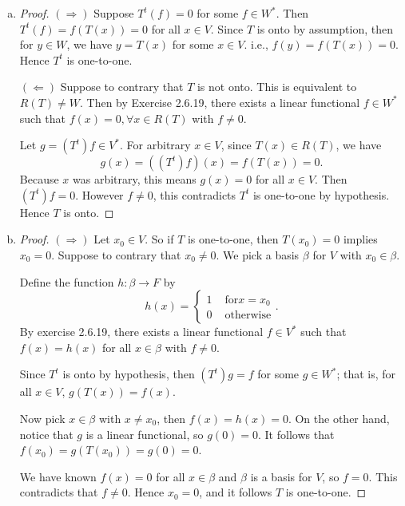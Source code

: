 \begin{Exercise}
\begin{enumerate}[(a)]
\item
\begin{proof}
$(\Longrightarrow)$
Suppose $T^t(f) = 0$ for some $f\in W^*$. Then $T^t(f) = f(T(x)) = 0$ for all $x\in V$. Since $T$ is onto by assumption, then for $y\in W$, we have $y=T(x)$ for some $x\in V$. i.e., $f(y) = f(T(x)) = 0$. Hence $T^t$ is one-to-one.

\vspace{2ex}

$(\Longleftarrow)$
Suppose to contrary that $T$ is not onto. This is equivalent to $R(T)\neq W$. Then by Exercise 2.6.19, there exists a linear functional $f\in W^*$ such that $f(x) = 0, \forall x\in R(T)$ with $f\neq 0$.

Let $g=(T^t)f\in V^*$. For arbitrary $x\in V$, since $T(x)\in R(T)$, we have
$$
g(x) = ((T^t)f)(x) = f(T(x)) = 0.
$$
Because $x$ was arbitrary, this means $g(x) = 0$ for all $x\in V$. Then $(T^t)f = 0$. However $f\neq 0$, this contradicts $T^t$ is one-to-one by hypothesis. Hence $T$ is onto.
\end{proof}

\item
\begin{proof}
$(\Longrightarrow)$
Let $x_0\in V$. So if $T$ is one-to-one, then $T(x_0) = 0$ implies $x_0 = 0$. Suppose to contrary that $x_0\neq 0$. We pick a basis $\beta$ for $V$ with $x_0\in\beta$.

Define the function $h:\beta\to F$ by
$$
h(x) = \begin{cases}
1 & \mbox{ for} x=x_0 \\
0 & \mbox{ otherwise}
\end{cases}.
$$
By exercise 2.6.19, there exists a linear functional $f\in V^*$ such that $f(x) = h(x)$ for all $x\in \beta$ with $f\neq 0$.

Since $T^t$ is onto by hypothesis, then $(T^t)g = f$ for some $g\in W^*$; that is, for all $x\in V$, $g(T(x)) = f(x)$.

Now pick $x\in\beta$ with $x\neq x_0$, then $f(x) = h(x)=0$. On the other hand, notice that $g$ is a linear functional, so $g(0) = 0$. It follows that $f(x_0) = g(T(x_0)) = g(0) = 0$.

We have known $f(x) = 0$ for all $x\in\beta$ and $\beta$ is a basis for $V$, so $f=0$. This contradicts that $f\neq 0$. Hence $x_0 = 0$, and it follows $T$ is one-to-one.


\end{proof}
\end{enumerate}
\end{Exercise}
